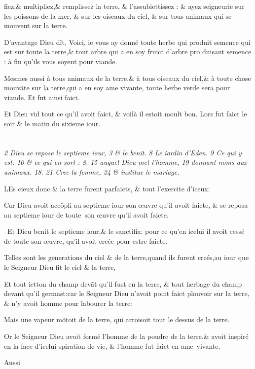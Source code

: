 \documentclass[twocolumn,paper=a4,pagesize=pdftex,12pt,headinclude=on]{scrbook}
\newenvironment{chaptercomment}
  {%
    \setlength{\leftskip}{1em}
    \setlength{\rightskip}{1em}
    \begin{spacing}{0.8}
      \itshape\tiny\hspace{-2em}}
  {%
    \end{spacing}
    \setlength{\leftskip}{0pt}
    \setlength{\rightskip}{0pt}
  }
\newcounter{verse}
\newcommand{\bverse}{%
  \linebreak
  \addtocounter{verse}{1}
  \theverse\quad
}
\newcommand{\bversenonum}{%
   \addtocounter{verse}{1}
   \par
}
\newcommand{\bchapter}[1][chapitre]{%
   \setcounter{verse}{0}%
   \def\chaptertitle{#1}
   \section{}{}
   \setcounter{footnotemain}{0}
}
\begin{document}

fiez,\& multipliez,\& remplissez la terre,
\& l'assubiettissez : \& \footnotemarkmain{}ayez seigneurie
sur les poissons de la mer, \& sur les oi\-seaux
du ciel, \& sur tous animaux qui se mouvent sur la terre.
\bverse D'avantage Dieu dît, Voici, ie vous
ay donné toute herbe qui produit se\-mence
qui est sur toute la terre,\& tout
arbre qui a en soy fruict d'arbre pro\-
duisant semence : \footnotemarkverse{}à fin qu'ils vous
soyent pour viande.
\bverse Mesmes aussi à tous animaux de la
terre,\& à tous oiseaux du ciel,\& à tou\-te
chose mouv\~ate sur la terre,qui a en
soy ame vivante, toute herbe verde se\-ra
pour viande. Et fut ainsi faict.
\bverse \footnotemarkmain{} \footnotemarkverse{}Et Dieu vid
tout ce qu'il avoit faict, \& voilà il estoit moult bon. Lors
fut faict le soir \& le matin du sixieme
iour.

\enlargethispage{\footskip}


\bchapter[chap.]
\pagestyle{scrplain}

\vspace{\baselineskip}

\begin{chaptercomment}
 \emph{2} Dieu se repose le septieme iour,
 \emph{3} \& le benit.
 \emph{8} Le iardin d'Eden. \linebreak
 \emph{9} Ce qui y est.
 \emph{10} \& ce qui en sort :
 \emph{8. 15} auquel Dieu \linebreak
 met l'homme,
 \emph{19} donnant noms aux animaux.
 \emph{18. 21} Cree la \linebreak
 femme,
 \emph{24} \& institue le mariage.
\end{chaptercomment}

\vspace{\baselineskip}

\bversenonum \lettrine[lines=3,loversize=-0.2,lraise=0.2]{L}{}Es cieux donc \& la terre furent
parfaicts, \& tout l'exercite d'i\-ceux:
\bverse \footnotemarkmain{}Car Dieu avoit acc\~opli au septie\-me
iour son \oe{}uvre qu'il avoit faicte, \linebreak
\footnotemarkmain{}\& se reposa au septieme iour de tou\-te~son
\oe{}uvre qu'il avoit faicte.
\bverse Et Dieu \footnotemarkmain{}benit le septieme iour,\& le
sanctifia: pour ce qu'en icelui il avoit
cessé de toute son \oe{}uvre, qu'il avoit
creée pour estre faicte.
\bverse Telles sont les generations du ciel
\& de la terre,quand ils furent creés,au
iour que le Seigneur Dieu fit le ciel \&
la terre,
\bverse Et tout ietton du champ dev\~at qu'il
fust en la terre, \& tout herbage du
champ devant qu'il germast:car le Sei\-gneur
Dieu n'avoit point faict \footnotemarkmain{}plou\-voir
sur la terre, \& n'y avoit homme
pour labourer la terre:
\bverse Mais une vapeur m\~otoit de la terre,
qui arroisoit tout le dessus de la terre.
\bverse Or le Seigneur Dieu avoit formé
l'homme \footnotemarkmain{}de la poudre
de la terre,\footnotemarkmain{}\&
avoit inspiré en la face d'icelui spira\-tion
de vie, \& l'homme fut faict en
ame~vivante.

\begin{flushright}
Aussi
\end{flushright}

\enlargethispage{\footskip}
\end{document}
